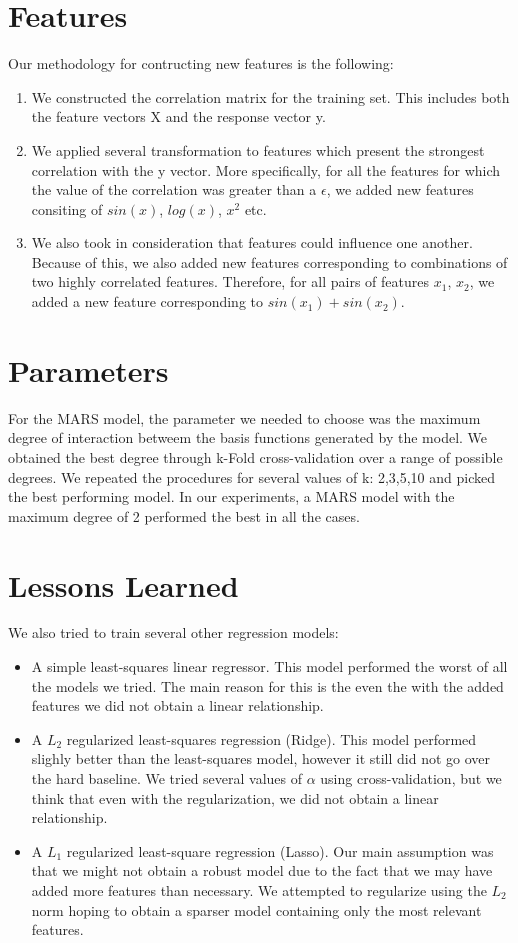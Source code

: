 \documentclass[a4paper, 11pt]{article}
\begin{document}
\section{Features}
Our methodology for contructing new features is the following:  
\begin{enumerate}
    \item We constructed the correlation matrix for the training set. This includes both the feature vectors X and the response vector y.
    \item We applied several transformation to features which present the strongest correlation with the y vector. More specifically, for all the features for which the value of the correlation was greater than a $\epsilon$, we added new features consiting of $sin(x)$, $log(x)$, $x^2$ etc.
    \item We also took in consideration that features could influence one another. Because of this, we also added new features corresponding to combinations of two highly correlated features. Therefore, for all pairs of features $x_1$, $x_2$, we added a new feature corresponding to $sin(x_1) + sin(x_2)$.
    
\end{enumerate}

\section{Parameters}

For the MARS model, the parameter we needed to choose was the maximum degree of interaction betweem the basis functions generated by the model. We obtained the best degree through k-Fold cross-validation over a range of possible degrees. We repeated the procedures for several values of k: 2,3,5,10 and picked the best performing model. In our experiments, a MARS model with the maximum degree of 2 performed the best in all the cases.

\section{Lessons Learned}
We also tried to train several other regression models:
\begin{itemize}
    \item A simple least-squares linear regressor. This model performed the worst of all the models we tried. The main reason for this is the even the with the added features we did not obtain a linear relationship. 
    \item A $L_2$ regularized least-squares regression (Ridge). This model performed slighly better than the least-squares model, however it still did not go over the hard baseline. We tried several values of $\alpha$ using cross-validation, but we think that even with the regularization, we did not obtain a linear relationship.
    \item A $L_1$ regularized least-square regression (Lasso). Our main assumption was that we might not obtain a robust model due to the fact that we may have added more features than necessary. We attempted to regularize using the $L_2$ norm hoping to obtain a sparser model containing only the most relevant features.
\end{itemize}
\end{document}
